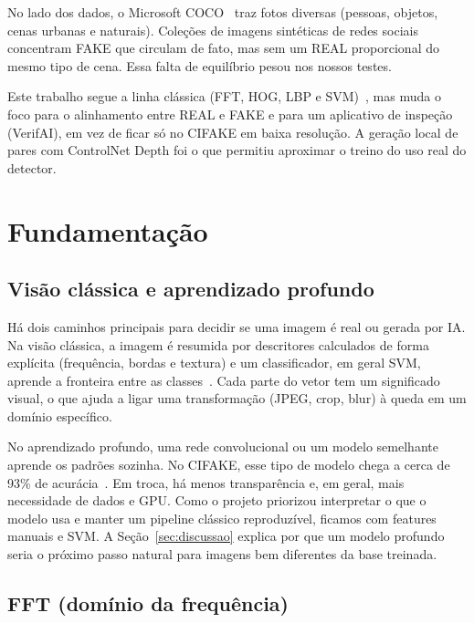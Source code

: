 \documentclass[12pt]{article}
\begin{document}
No lado dos dados, o Microsoft COCO~\cite{coco2017} traz fotos diversas (pessoas, objetos, cenas urbanas e naturais). Coleções de imagens sintéticas de redes sociais~\cite{harvardAIGI} concentram FAKE que circulam de fato, mas sem um REAL proporcional do mesmo tipo de cena. Essa falta de equilíbrio pesou nos nossos testes.

Este trabalho segue a linha clássica (FFT, HOG, LBP e SVM)~\cite{gonzalez2018,dalal2005hog,ojala2002lbp,cortes1995svm}, mas muda o foco para o alinhamento entre REAL e FAKE e para um aplicativo de inspeção (VerifAI), em vez de ficar só no CIFAKE em baixa resolução. A geração local de pares com ControlNet Depth foi o que permitiu aproximar o treino do uso real do detector.

\section{Fundamentação}
\label{sec:fundamentacao}

\subsection{Visão clássica e aprendizado profundo}

Há dois caminhos principais para decidir se uma imagem é real ou gerada por IA. Na visão clássica, a imagem é resumida por descritores calculados de forma explícita (frequência, bordas e textura) e um classificador, em geral SVM, aprende a fronteira entre as classes~\cite{gonzalez2018,nirob2026handcrafted}. Cada parte do vetor tem um significado visual, o que ajuda a ligar uma transformação (JPEG, crop, blur) à queda em um domínio específico.

No aprendizado profundo, uma rede convolucional ou um modelo semelhante aprende os padrões sozinha. No CIFAKE, esse tipo de modelo chega a cerca de 93\% de acurácia~\cite{bird2024cifake}. Em troca, há menos transparência e, em geral, mais necessidade de dados e GPU. Como o projeto priorizou interpretar o que o modelo usa e manter um pipeline clássico reproduzível, ficamos com features manuais e SVM. A Seção~\ref{sec:discussao} explica por que um modelo profundo seria o próximo passo natural para imagens bem diferentes da base treinada.

\subsection{FFT (domínio da frequência)}
\end{document}
